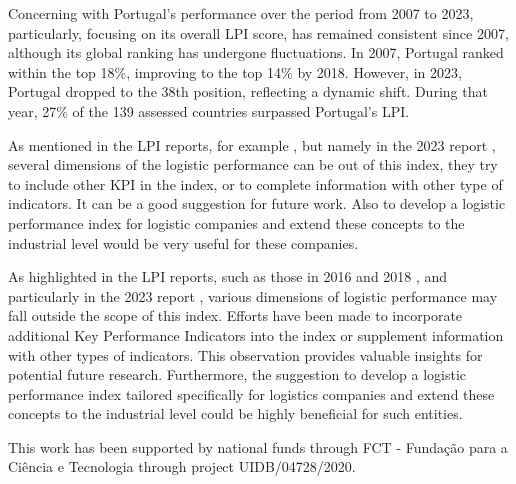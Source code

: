\documentclass[sigconf]{acmart}
\begin{document}
Concerning with Portugal's performance over the period from 2007 to 2023, particularly, focusing on its overall LPI score, has remained consistent since 2007, although its global ranking has undergone fluctuations. In 2007, Portugal ranked within the top 18\%, improving to the top 14\% by 2018. However, in 2023, Portugal dropped to the 38th position, reflecting a dynamic shift. During that year, 27\% of the 139 assessed countries surpassed Portugal's LPI. 

As mentioned in the LPI reports, for example \cite{WBreport2016,WBreport2018}, but namely in the 2023 report \cite{WBreport2023}, several dimensions of the logistic performance can be out of this index, they try to include other KPI in the index, or to complete information with other type of indicators. It can be a good suggestion for future work. Also to develop a logistic performance index for logistic companies and extend these concepts to the industrial level would be very useful for these companies.


As highlighted in the LPI reports, such as those in 2016 and 2018 \cite{WBreport2016, WBreport2018}, and particularly in the 2023 report \cite{WBreport2023}, various dimensions of logistic performance may fall outside the scope of this index. Efforts have been made to incorporate additional Key Performance Indicators into the index or supplement information with other types of indicators. This observation provides valuable insights for potential future research. Furthermore, the suggestion to develop a logistic performance index tailored specifically for logistics companies and extend these concepts to the industrial level could be highly beneficial for such entities.




\begin{acks}
This work has been supported by national funds through FCT - Fundação para a Ciência e Tecnologia through project UIDB/04728/2020.
\end{acks}





\appendix
\end{document}
